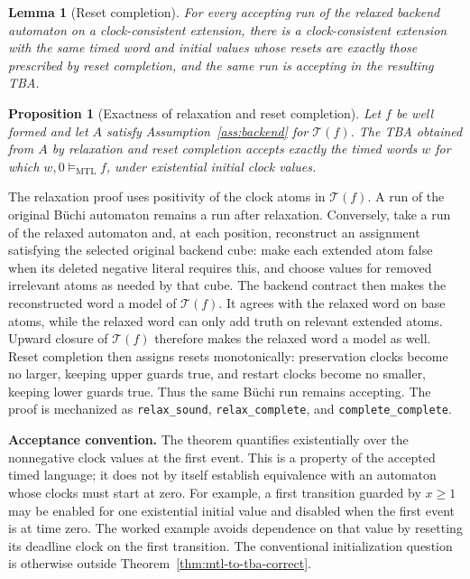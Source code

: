 \documentclass[10pt,journal,compsoc]{IEEEtran}
\newtheorem{lemma}[theorem]{Lemma}
\newtheorem{proposition}[theorem]{Proposition}
\newcommand{\satM}{\models_{\mathrm{MTL}}}
\newcommand{\T}{\mathcal{T}}
\newcommand{\runinhead}[1]{\par\smallskip\noindent\textbf{#1}\enspace}
\begin{document}
\begin{lemma}[Reset completion]
\label{lem:reset-completion}
For every accepting run of the relaxed backend automaton on a
clock-consistent extension, there is a clock-consistent extension with the
same timed word and initial values whose resets are exactly those prescribed
by reset completion, and the same run is accepting in the resulting TBA.
\end{lemma}

\begin{proposition}[Exactness of relaxation and reset completion]
\label{prop:reset-completion}
Let $f$ be well formed and let $A$ satisfy Assumption~\ref{ass:backend}
for $\T(f)$. The TBA obtained from $A$ by relaxation and reset completion
accepts exactly the timed words $w$ for which $w,0\satM f$, under
existential initial clock values.
\end{proposition}
The relaxation proof uses positivity of the clock atoms in $\T(f)$. A run
of the original B\"uchi automaton remains a run after relaxation. Conversely,
take a run of the relaxed automaton and, at each position, reconstruct an
assignment satisfying the selected original backend cube: make each extended
atom false when its deleted negative literal requires this, and choose values
for removed irrelevant atoms as needed by that cube. The backend contract
then makes the reconstructed word a model of $\T(f)$. It agrees with the
relaxed word on base atoms, while the relaxed word can only add truth on
relevant extended atoms. Upward closure of $\T(f)$ therefore makes the
relaxed word a model as well.
Reset completion then assigns resets monotonically: preservation clocks
become no larger, keeping upper guards true, and restart clocks become no
smaller, keeping lower guards true. Thus the same B\"uchi run remains
accepting. The proof is mechanized as
\texttt{relax\_sound}, \texttt{relax\_complete}, and
\texttt{complete\_complete}.

\runinhead{Acceptance convention.}
The theorem quantifies existentially over the nonnegative clock values at
the first event. This is a property of the accepted timed language; it does
not by itself establish equivalence with an automaton whose clocks must
start at zero. For example, a first transition guarded by $x\ge1$ may be
enabled for one existential initial value and disabled when the first event
is at time zero. The worked example avoids dependence on that value by
resetting its deadline clock on the first transition. The conventional
initialization question is otherwise outside Theorem~\ref{thm:mtl-to-tba-correct}.
\end{document}
